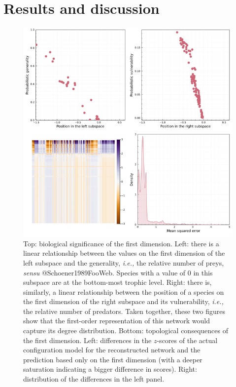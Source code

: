 \section{Results and discussion}\label{results-and-discussion}

\begin{figure}[h]
    \centering
    \includegraphics[width=\textwidth]{figures/figure-degree.png}
    \caption{Top: biological significance of the first dimension. Left:
there is a linear relationship between the values on the first dimension
of the left subspace and the generality, \emph{i.e.,} the relative number
of preys, \emph{sensu} @Schoener1989FooWeb. Species with a value of 0 in
this subspace are at the bottom-most trophic level. Right: there is,
similarly, a linear relationship between the position of a species on
the first dimension of the right subspace and its vulnerability,
\emph{i.e.,} the relative number of predators. Taken together, these two
figures show that the first-order representation of this network would
capture its degree distribution. Bottom: topological consequences of the
first dimension. Left: differences in the \(z\)-scores of the actual
configuration model for the reconstructed network and the prediction
based only on the first dimension (with a deeper saturation indicating a
bigger difference in scores). Right: distribution of the differences in
the left panel.}
    \label{fig:degree}
\end{figure}

